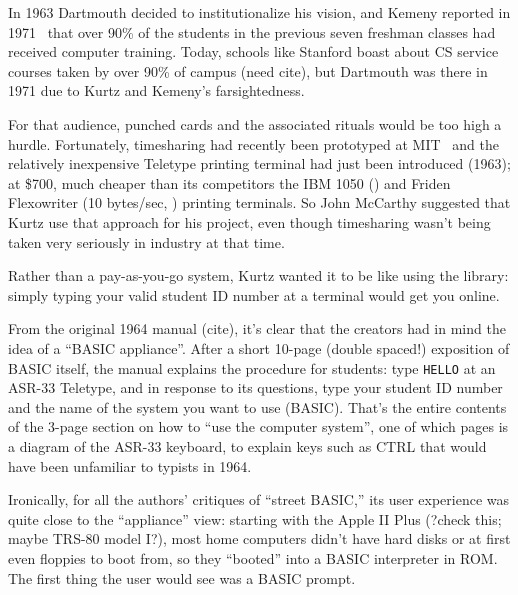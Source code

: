 \documentclass{article}
\newcommand{\T}{\texttt}
\begin{document}
In 1963 Dartmouth decided to
institutionalize his vision, and Kemeny reported in
1971~\cite{man_and_computer} that
over 90\% of the students in the previous seven freshman classes had
received computer training.  Today, schools like Stanford boast about
CS service courses taken by over 90\% of campus (need cite), but
Dartmouth was there in 1971 due to Kurtz and Kemeny's farsightedness.

For that audience, punched cards and the associated rituals would be too
high a hurdle.
Fortunately, timesharing had recently been prototyped at
MIT~\cite{corbato62timesharing} and the relatively inexpensive Teletype
 printing terminal had just been introduced (1963); at \$700,
much cheaper than its competitors the IBM 1050
() and
Friden Flexowriter (10 bytes/sec,
)
printing terminals.
So John McCarthy suggested that Kurtz use that approach for his project,
even though timesharing wasn't being taken very seriously in industry at
that time.

Rather than a
pay-as-you-go system, Kurtz wanted it to be like using the library:
simply typing your valid student ID number at a terminal would get you
online.

From the original 1964 manual (cite), it's clear that the creators had
in mind the idea of a ``BASIC appliance''.  After a short 10-page
(double spaced!) exposition of BASIC itself, the manual
explains the procedure for students: type \T{HELLO} at an ASR-33
Teletype, and in response to its questions, type your student ID number
and the name of the system you want to use (BASIC).  That's the entire
contents of the  3-page section on how to ``use the computer system'',
one of which pages is a diagram of the ASR-33 keyboard,
to explain keys such as CTRL that would have been unfamiliar to
typists in 1964.

Ironically, for all the authors' critiques of ``street BASIC,'' its user
experience was quite close to the ``appliance'' view: starting with the
Apple II Plus (?check this; maybe TRS-80 model I?), most home computers
didn't have hard disks or at first even floppies to boot from, so they
``booted'' into a BASIC interpreter in ROM.  The first thing the user
would see was a BASIC prompt. 

\end{document}
